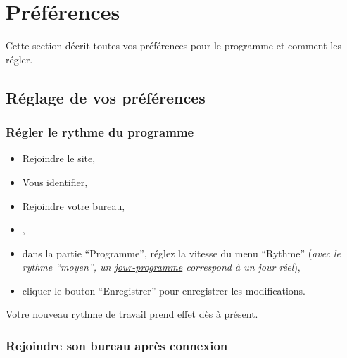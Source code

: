 % 
% 
% 
% 
% 
% 
% 
% 

\chapter{Préférences}\hypertarget{preferences-auteur}{}\label{preferences-auteur}

Cette section décrit toutes vos préférences pour le programme \unan{} et comment les régler.

\section{Réglage de vos préférences}\hypertarget{reglage-preferences}{}\label{reglage-preferences}

\subsection{Régler le rythme du programme}\hypertarget{regler-rythme}{}\label{regler-rythme}

\begin{itemize}
\item \hyperlink{rejoindre-site}{Rejoindre le site},
\item \hyperlink{vous-identifier}{Vous identifier},
\item \hyperlink{rejoindre-bureau}{Rejoindre votre bureau},
\item {},
\item dans la partie \enquote{Programme}, réglez la vitesse du menu \enquote{Rythme} (\emph{avec le rythme \enquote{moyen}, un \hyperlink{explicationjourprogrammejourreel}{jour-programme} correspond à un jour réel}),
\item cliquer le bouton \enquote{Enregistrer} pour enregistrer les modifications.
\end{itemize}

Votre nouveau rythme de travail prend effet dès à présent.

\subsection{Rejoindre son bureau après connexion}\hypertarget{rejoindre-bureau-apres-connexion}{}\label{rejoindre-bureau-apres-connexion}

